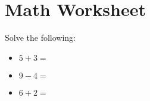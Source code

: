 \documentclass{article}
\begin{document}
\section*{Math Worksheet}

Solve the following:

\begin{itemize}
  \item $5 + 3 = $
  \item $9 - 4 = $
  \item $6 + 2 = $
\end{itemize}
\end{document}
